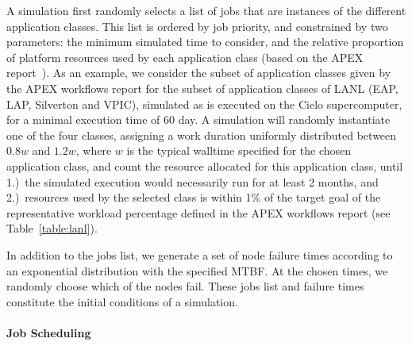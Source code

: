 A simulation first randomly selects a list of jobs that are instances of the
different application classes. This list is ordered by job priority, and constrained
by two parameters: the minimum simulated time to consider, and the relative
proportion of platform resources used by each application class (based on the APEX
report~\cite{apex2016}). 
As an example,
we consider the subset of application classes given by the APEX workflows report for
the subset of application classes of LANL (EAP, LAP, Silverton and VPIC), simulated
as is executed on the Cielo supercomputer, for a minimal execution time
of 60 day. A
simulation will randomly instantiate one of the four classes, assigning a work
duration uniformly distributed between $0.8w$ and $1.2w$, where $w$ is the typical
walltime specified for the chosen application class, and count the resource allocated
for this application class, until 1.)~the simulated execution would necessarily run
for at least 2 months, and 2.)~resources used by the selected class is
within 1\% of the target goal of the representative workload percentage defined in
the APEX workflows report (see Table~\ref{table:lanl}).

In addition to the jobs list, we generate a set of node failure times according to an
exponential distribution with the specified MTBF. At the chosen times, we randomly
choose which of the nodes fail.  These jobs list and failure times constitute
the initial conditions of a simulation.

\paragraph*{Job Scheduling}

